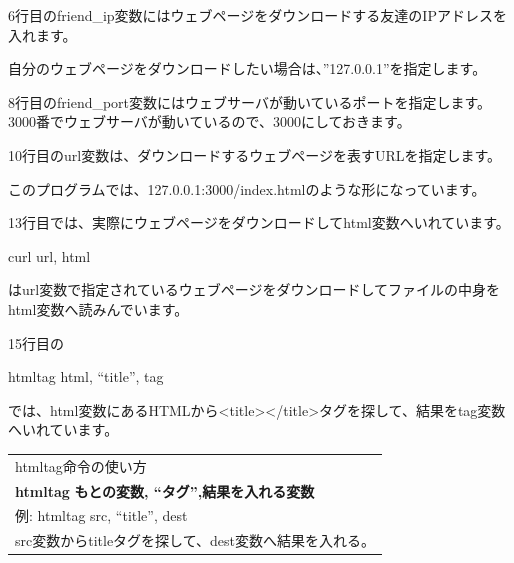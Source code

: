 \documentclass[text08.tex]{subfiles}
\begin{document}
\bigskip



\bigskip

6行目のfriend\_ip変数にはウェブページをダウンロードする友達のIPアドレスを入れます。

自分のウェブページをダウンロードしたい場合は、”127.0.0.1”を指定します。


\bigskip

8行目のfriend\_port変数にはウェブサーバが動いているポートを指定します。
3000番でウェブサーバが動いているので、3000にしておきます。


\bigskip

10行目のurl変数は、ダウンロードするウェブページを表すURLを指定します。

このプログラムでは、127.0.0.1:3000/index.htmlのような形になっています。


\bigskip

13行目では、実際にウェブページをダウンロードしてhtml変数へいれています。

curl url, html

はurl変数で指定されているウェブページをダウンロードしてファイルの中身をhtml変数へ読みんでいます。


\bigskip

\clearpage
15行目の

htmltag html, “title”, tag

では、html変数にあるHTMLから{\textless}title{\textgreater}{\textless}/title{\textgreater}タグを探して、結果をtag変数へいれています。


\bigskip








\begin{table}[htbp]
    \centering
    \begin{tabular}{|l|}
        \hline
        
        htmltag命令の使い方\\

        \textbf{htmltag} \textbf{もとの変数, “タグ”,結果を入れる変数}\\
        例: htmltag src, “title”, dest\\
        src変数からtitleタグを探して、dest変数へ結果を入れる。
        
        \\\hline
    \end{tabular}
\end{table}
\end{document}
